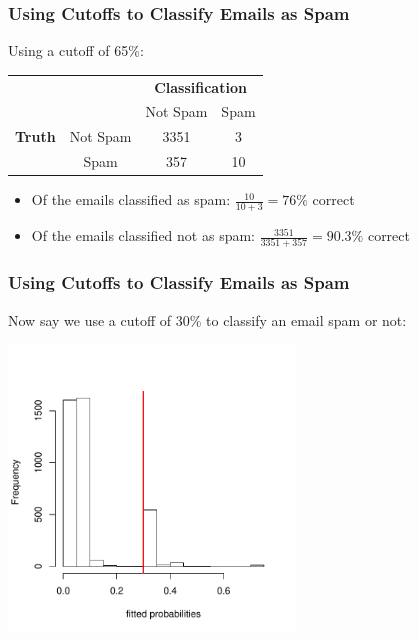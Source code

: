 \documentclass[slides]{beamer}
\newcommand{\blue}[1]{\textcolor{blue2}{#1}}
\begin{document}
\begin{frame}[fragile]
\frametitle{Using Cutoffs to Classify Emails as Spam}

Using a cutoff of 65\%:
\begin{center}
  \begin{tabular}{cc|cc}
     \multicolumn{2}{c}{}  & \multicolumn{2}{c}{\textbf{Classification}} \\ 
     &  & Not Spam & Spam \\ 
\hline
    \textbf{Truth} & Not Spam & 3351 & 3\\
     & Spam & 357 & 10\\ 
    \hline
  \end{tabular}
\end{center}
\pause
\begin{itemize}
\item Of the emails classified as spam:  $\frac{10}{10+3} = 76\%$ correct
\item Of the emails classified not as spam:  $\frac{3351}{3351+357} = 90.3\%$ correct
\end{itemize}


\end{frame}


\begin{frame}[fragile]
\frametitle{Using Cutoffs to Classify Emails as Spam}

Now say we use a cutoff of 30\% to \blue{classify} an email spam or not:
\begin{center}
\includegraphics[width=3in]{figure/fitted3.pdf}
\end{center}

\end{frame}
\end{document}
